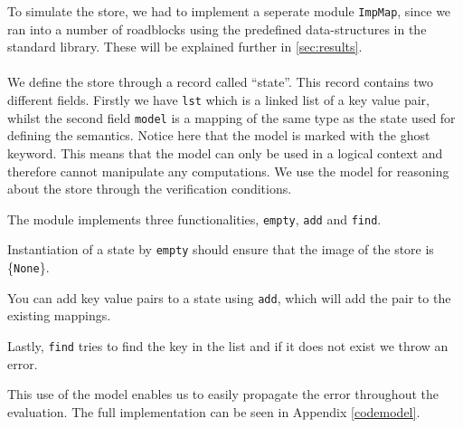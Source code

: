 To simulate the store, we had to implement a seperate module \texttt{ImpMap},
since we ran into a number of roadblocks using the predefined data-structures in the standard library.
These will be explained further in \ref{sec:results}.
\\~\\
We define the store through a record called ``state''.
This record contains two different fields.
Firstly we have \texttt{lst} which is a linked list of a key value pair,
whilst the second field \texttt{model} is a mapping of the same type as the state used for defining the semantics.
Notice here that the model is marked with the ghost keyword. This means that the model can only be used in a logical context
and therefore cannot manipulate any computations.
We use the model for reasoning about the store through the verification conditions.

The module implements three functionalities, \texttt{empty}, \texttt{add} and \texttt{find}.

Instantiation of a state by \texttt{empty} should ensure that the image of the store is \{\texttt{None}\}.

You can add key value pairs to a state using \texttt{add}, which will add the pair to the existing mappings.

Lastly, \texttt{find} tries to find the key in the list and if it does not exist we throw an error.

This use of the model enables us to easily propagate the error throughout the evaluation.
The full implementation can be seen in Appendix \ref{codemodel}.








